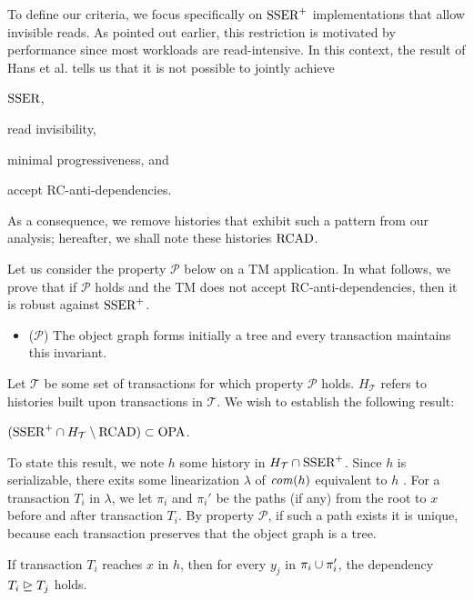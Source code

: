 To define our criteria, we focus specifically on $\SPSER$ implementations that allow invisible reads.
As pointed out earlier, this restriction is motivated by performance since most workloads are read-intensive.
In this context, the result of Hans et al. \cite{hans16} tells us that it is not possible to jointly achieve
\begin{inparaenum}
\item $\SSER$,
\item read invisibility,
\item minimal progressiveness, and
\item accept RC-anti-dependencies.
\end{inparaenum}
As a consequence, we remove histories that exhibit such a pattern from our analysis;
hereafter, we shall note these histories $\RCAD$.

Let us consider the property $\mathcal{P}$ below on a TM application.
In what follows, we prove that if $\mathcal{P}$ holds and the TM does not accept RC-anti-dependencies, then it is robust against $\SPSER$.
\begin{itemize}
  \item($\mathcal{P}$) The object graph forms initially a tree and every transaction maintains this invariant.
\end{itemize}
Let $\mathcal{T}$ be some set of transactions for which property $\mathcal{P}$ holds.
$H_{\mathcal{T}}$ refers to histories built upon transactions in $\mathcal{T}$.
We wish to establish the following result:

\begin{proposition}
  $(\SPSER \inter H_{\mathcal{T}} \setminus \RCAD) \subset \OPA$.
\end{proposition}

To state this result, we note $h$ some history  in $H_{\mathcal{T}} \inter \SPSER$.
Since $h$ is serializable, there exits some linearization $\lambda$ of $\committed{h}$ equivalent to $h$ \cite{}.
For a transaction $T_i$ in $\lambda$, we let $\pi_i$ and $\pi_i'$ be the paths (if any) from the root to $x$ before and after transaction $T_i$.
By property $\mathcal{P}$, if such a path exists it is unique, because each transaction preserves that the object graph is a tree.

\begin{lemma}
  If transaction $T_i$ reaches $x$ in $h$, then for every $y_j$ in $\pi_i \cup \pi_i'$, the dependency $T_i \mathrel{\unrhd} T_j$ holds. 
\end{lemma}

